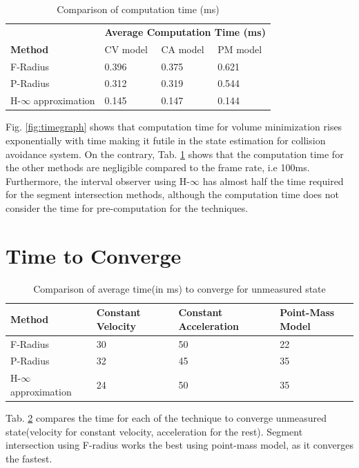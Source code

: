 \begin{table}[htbp]
\caption{Comparison of computation time (ms)\\}
	\centering
	\renewcommand{\arraystretch}{1.1}
	\small	
	\begin{tabular}{l l l l}
		\toprule
		& \multicolumn{3}{c}{\textbf{Average Computation Time (ms)}}\\
		\textbf{Method} & CV model & CA model & PM model\\ \midrule
		F-Radius & 0.396 & 0.375 & 0.621 \\
		P-Radius & 0.312 & 0.319 & 0.544\\
		H-$\infty$ approximation & 0.145 & 0.147 & 0.144\\
		\bottomrule
	\end{tabular}
	\label{tab:comptime}
\end{table}
Fig. \ref{fig:timegraph} shows that computation time for volume minimization rises exponentially with time making it futile in the state estimation for collision avoidance system. On the contrary, Tab. \ref{tab:comptime} shows that the computation time for the other methods are negligible compared to the frame rate, i.e 100ms. Furthermore, the interval observer using H-$\infty$ has almost half the time required for the segment intersection methods, although the computation time does not consider the time for pre-computation for the techniques.



\section{Time to Converge}
\begin{table}[htbp]
\caption{Comparison of average time(in ms) to converge for unmeasured state\\}
	\centering
	\renewcommand{\arraystretch}{1.1}
	\small	
	\begin{tabular}{l l l l}
		\toprule 
		\textbf{Method} & \textbf{Constant Velocity} & \textbf{Constant Acceleration} & \textbf{Point-Mass Model} \\ \midrule
		F-Radius & 30 & 50 & 22\\
		P-Radius & 32 & 45 & 35\\
		H-$\infty$ approximation & 24 & 50 & 35\\
		\bottomrule
	\end{tabular}
	\label{tab:convtime}
\end{table}
Tab. \ref{tab:convtime} compares the time for each of the technique to converge unmeasured state(velocity for constant velocity, acceleration for the rest). Segment intersection using F-radius works the best using point-mass model, as it converges the fastest.


